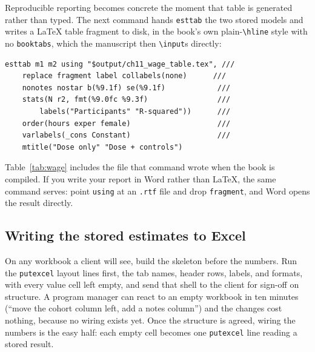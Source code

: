 Reproducible reporting becomes concrete the moment that table is generated rather than typed. The next command hands \texttt{esttab} the two stored models and writes a \LaTeX{} table fragment to disk, in the book's own plain-\texttt{\textbackslash hline} style with no \texttt{booktabs}, which the manuscript then \texttt{\textbackslash input}s directly:
\par
{\footnotesize
\begin{verbatim}
esttab m1 m2 using "$output/ch11_wage_table.tex", ///
    replace fragment label collabels(none)      ///
    nonotes nostar b(%9.1f) se(%9.1f)            ///
    stats(N r2, fmt(%9.0fc %9.3f)                ///
        labels("Participants" "R-squared"))      ///
    order(hours exper female)                    ///
    varlabels(_cons Constant)                    ///
    mtitle("Dose only" "Dose + controls")
\end{verbatim}
}
Table~\ref{tab:wage} includes the file that command wrote when the book is compiled. If you write your report in Word rather than \LaTeX{}, the same command serves: point \texttt{using} at an \texttt{.rtf} file and drop \texttt{fragment}, and Word opens the result directly.

\begin{table}[htbp]
\centering
\caption[Reproducible earnings table, ingested from a do-file]{Program earnings model for a simulated workforce cohort (seed \texttt{20260704}). OLS coefficients with standard errors in parentheses; earnings are dollars per quarter. \textbf{This table is not typed:} \texttt{ch11\_tables.do} estimated the two models and wrote this exact \texttt{tabular} with \texttt{esttab}; the book ingests it with \texttt{\textbackslash input\{ch11\_wage\_table.tex\}}. Rerun the do-file and the numbers here update on the next compile.}
\label{tab:wage}

\end{table}


\subsection{Writing the stored estimates to Excel}\label{sec:ch11-excel-tab}
On any workbook a client will see, build the skeleton before the numbers. Run the \texttt{putexcel} layout lines first, the tab names, header rows, labels, and formats, with every value cell left empty, and send that shell to the client for sign-off on structure. A program manager can react to an empty workbook in ten minutes (\enquote{move the cohort column left, add a notes column}) and the changes cost nothing, because no wiring exists yet. Once the structure is agreed, wiring the numbers is the easy half: each empty cell becomes one \texttt{putexcel} line reading a stored result.

